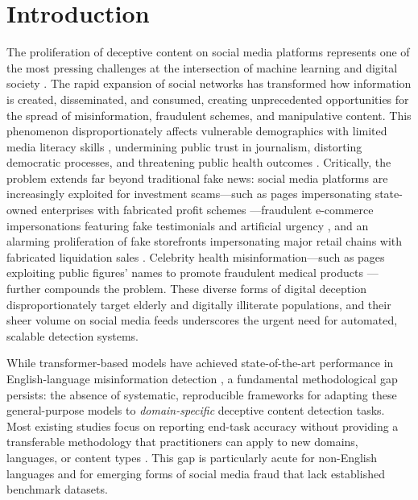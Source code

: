 \documentclass[informatics,article,submit,pdftex,moreauthors]{Definitions/mdpi}
\begin{document}
\section{Introduction}
The proliferation of deceptive content on social media platforms represents one of the most pressing challenges at the intersection of machine learning and digital society \citep{bondielli2019survey}. The rapid expansion of social networks has transformed how information is created, disseminated, and consumed, creating unprecedented opportunities for the spread of misinformation, fraudulent schemes, and manipulative content.  This phenomenon disproportionately affects vulnerable demographics with limited media literacy skills \citep{higdon2022agree, higdon2025constructive}, undermining public trust in journalism, distorting democratic processes, and threatening public health outcomes \citep{tsfati2020causes, allcott2017social}. Critically, the problem extends far beyond traditional fake news: social media platforms are increasingly exploited for investment scams—such as pages impersonating state-owned enterprises with fabricated profit schemes \citep{scam2025investment}—fraudulent e-commerce impersonations featuring fake testimonials and artificial urgency \citep{scam2025cosmetics, scam2025ecommerce}, and an alarming proliferation of fake storefronts impersonating major retail chains with fabricated liquidation sales \citep{scam2026aurrera1, scam2026aurrera2, scam2026aurrera3, scam2026celulares}. Celebrity health misinformation—such as pages exploiting public figures' names to promote fraudulent medical products \citep{scam2025health}—further compounds the problem.  These diverse forms of digital deception disproportionately target elderly and digitally illiterate populations, and their sheer volume on social media feeds underscores the urgent need for automated, scalable detection systems.

While transformer-based models have achieved state-of-the-art performance in English-language misinformation detection \citep{kaliyar2021fakebert, singh2024comprehensive, rout2025reliable}, a fundamental methodological gap persists: the absence of systematic, reproducible frameworks for adapting these general-purpose models to \textit{domain-specific} deceptive content detection tasks. Most existing studies focus on reporting end-task accuracy without providing a transferable methodology that practitioners can apply to new domains, languages, or content types \citep{alghamdi2024comprehensive}. This gap is particularly acute for non-English languages and for emerging forms of social media fraud that lack established benchmark datasets.
\end{document}
